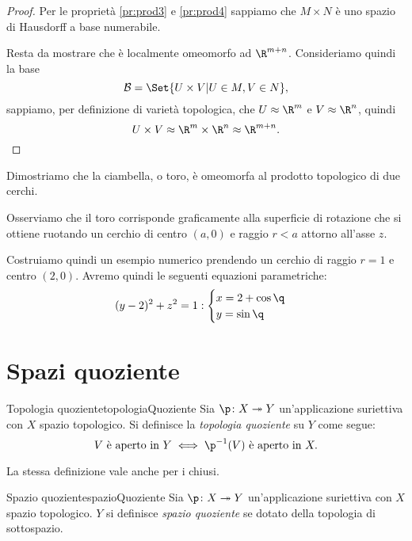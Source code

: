 \begin{proof}
	Per le proprietà \ref{pr:prod3} e \ref{pr:prod4} sappiamo che \(M\times N\) è uno spazio di Hausdorff a base numerabile.

	Resta da mostrare che è localmente omeomorfo ad \(\R^{m+n}\).
	Consideriamo quindi la base
	\[
		\mathcal{B} = \Set{U\times V | U\in M, V\in N},
	\]
	sappiamo, per definizione di varietà topologica, che \(U\approx \R^m\) e \(V\approx \R^n\), quindi
	\[
		U\times V \approx \R^m \times \R^n \approx \R^{m+n}.\qedhere
	\]
\end{proof}

\begin{ese}
	Dimostriamo che la ciambella, o toro, è omeomorfa al prodotto topologico di due cerchi.%

	Osserviamo che il toro corrisponde graficamente alla superficie di rotazione che si ottiene ruotando un cerchio di centro \((a,0)\) e raggio \(r<a\) attorno all'asse \(z\).

	Costruiamo quindi un esempio numerico prendendo un cerchio di raggio \(r=1\) e centro \((2,0)\).
	Avremo quindi le seguenti equazioni parametriche:
	\[
		(y-2)^2+z^2 = 1 : 	\begin{cases}
			x = 2+\cos\q \\
			y = \sin\q
		\end{cases}
	\]
\end{ese}
\section{Spazi quoziente}

\begin{defn}{Topologia quoziente}{topologiaQuoziente}
	Sia \(\p\colon X \twoheadrightarrow Y\) un'applicazione suriettiva con \(X\) spazio topologico.
	Si definisce la \emph{topologia quoziente} su \(Y\) come segue:
	\[
		V \text{ è aperto in } Y \iff \p^{-1}(V) \text{ è aperto in }X.
	\]
\end{defn}

\begin{oss}
	La stessa definizione vale anche per i chiusi.
\end{oss}

\begin{defn}{Spazio quoziente}{spazioQuoziente}
	Sia \(\p\colon X \twoheadrightarrow Y\) un'applicazione suriettiva con \(X\) spazio topologico.
	\(Y\) si definisce \emph{spazio quoziente} se dotato della topologia di sottospazio.
\end{defn}

